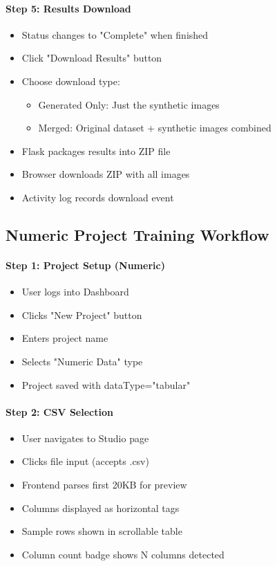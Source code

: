 \documentclass[11pt,a4paper]{article}
\begin{document}
\paragraph{Step 5: Results Download}
\begin{itemize}[noitemsep]
    \item Status changes to "Complete" when finished
    \item Click "Download Results" button
    \item Choose download type:
    \begin{itemize}
        \item Generated Only: Just the synthetic images
        \item Merged: Original dataset + synthetic images combined
    \end{itemize}
    \item Flask packages results into ZIP file
    \item Browser downloads ZIP with all images
    \item Activity log records download event
\end{itemize}

\subsection{Numeric Project Training Workflow}

\paragraph{Step 1: Project Setup (Numeric)}
\begin{itemize}[noitemsep]
    \item User logs into Dashboard
    \item Clicks "New Project" button
    \item Enters project name
    \item Selects "Numeric Data" type
    \item Project saved with dataType="tabular"
\end{itemize}

\paragraph{Step 2: CSV Selection}
\begin{itemize}[noitemsep]
    \item User navigates to Studio page
    \item Clicks file input (accepts .csv)
    \item Frontend parses first 20KB for preview
    \item Columns displayed as horizontal tags
    \item Sample rows shown in scrollable table
    \item Column count badge shows N columns detected
\end{itemize}
\end{document}
